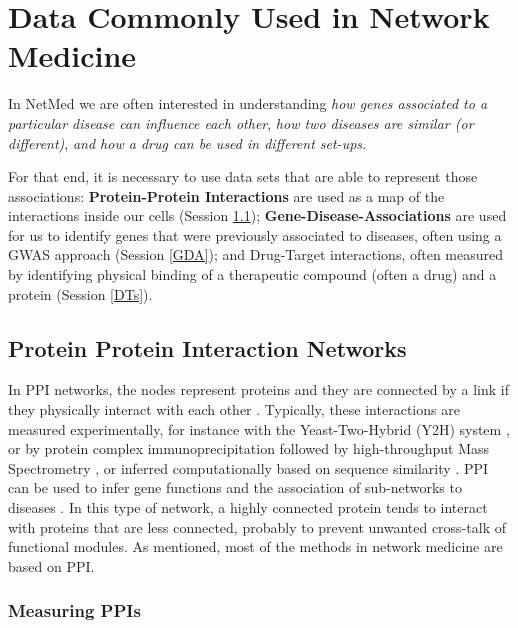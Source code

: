\documentclass[
]{book}
\begin{document}
\hypertarget{data-commonly-used-in-network-medicine}{%
\chapter{Data Commonly Used in Network Medicine}\label{data-commonly-used-in-network-medicine}}

In NetMed we are often interested in understanding \emph{how genes associated to a particular disease can influence each other}, \emph{how two diseases are similar (or different)}, \emph{and how a drug can be used in different set-ups.}

For that end, it is necessary to use data sets that are able to represent those associations: \textbf{Protein-Protein Interactions} are used as a map of the interactions inside our cells (Session \ref{PPI}); \textbf{Gene-Disease-Associations} are used for us to identify genes that were previously associated to diseases, often using a GWAS approach (Session \ref{GDA}); and Drug-Target interactions, often measured by identifying physical binding of a therapeutic compound (often a drug) and a protein (Session \ref{DTs}).

\hypertarget{PPI}{%
\section{Protein Protein Interaction Networks}\label{PPI}}

In PPI networks, the nodes represent proteins and they are connected by a link if they physically interact with each other \citep{rual2005}. Typically, these interactions are measured experimentally, for instance with the Yeast-Two-Hybrid (Y2H) system \citep{uetz2000}, or by protein complex immunoprecipitation followed by high-throughput Mass Spectrometry \citep{zhang2008, koh2012}, or inferred computationally based on sequence similarity \citep{fong2004}. PPI can be used to infer gene functions and the association of sub-networks to diseases \citep{Menche2015}. In this type of network, a highly connected protein tends to interact with proteins that are less connected, probably to prevent unwanted cross-talk of functional modules. As mentioned, most of the methods in network medicine are based on PPI.

\hypertarget{measuring-ppis}{%
\subsection{Measuring PPIs}\label{measuring-ppis}}
\end{document}
